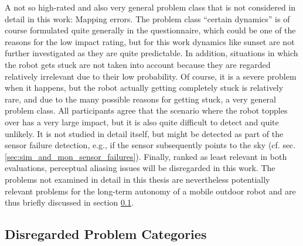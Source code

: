 \documentclass[english, master, utf8]{base/thesis_KBS}
\begin{document}
\noindent
A not so high-rated and also very general problem class that is not considered in detail in this work: Mapping errors. The problem class ``certain dynamics'' is of course formulated
quite generally in the questionnaire, which could be one of the reasons for the low impact rating, but for this work dynamics like sunset are not further investigated as they are
quite predictable. In addition, situations in which the robot gets stuck are not taken into account because they are regarded relatively irrelevant due to their low probability.
Of course, it is a severe problem when it happens, but the robot actually getting completely stuck is relatively rare, and due to the many possible reasons for getting stuck, 
a very general problem class. All participants agree that the scenario where the robot topples over has a very large impact, but it is also quite difficult to detect and quite
unlikely. It is not studied in detail itself, but might be detected as part of the sensor failure detection, e.g., if the sensor subsequently points to the sky (cf. sec.
\ref{sec:sim_and_mon_sensor_failures}). Finally, ranked as least relevant in both evaluations, perceptual aliasing issues will be disregarded in this work. The problems not examined
in detail in this thesis are nevertheless potentially relevant problems for the long-term autonomy of a mobile outdoor robot and are thus briefly discussed in section
\ref{sec:lta_problems_not_considered}.

\subsection{Disregarded Problem Categories}
\label{sec:lta_problems_not_considered}
\end{document}
